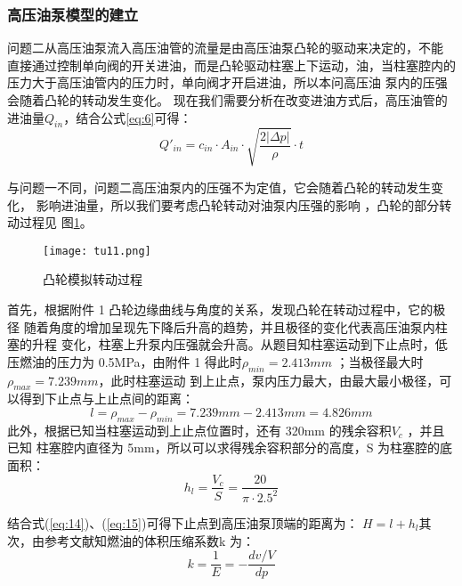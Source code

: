 \documentclass{cumcmthesis}
\begin{document}
\subsubsection{高压油泵模型的建立}
问题二从高压油泵流入高压油管的流量是由高压油泵凸轮的驱动来决定的\textsuperscript{\cite{bib:six}}，不能 直接通过控制单向阀的开关进油，而是凸轮驱动柱塞上下运动\textsuperscript{\cite{bib:seven}}，油，当柱塞腔内的压力大于高压油管内的压力时，单向阀才开启进油，所以本问高压油 泵内的压强会随着凸轮的转动发生变化。 现在我们需要分析在改变进油方式后，高压油管的进油量$Q_{in}$，结合公式\ref{eq:6}可得： 
\begin{equation*}
Q'_{in}=c_{in}\cdot A_{in}\cdot \sqrt{\frac {2 \lvert \Delta p \rvert}{\rho}}\cdot t
\end{equation*}

 与问题一不同，问题二高压油泵内的压强不为定值，它会随着凸轮的转动发生变化， 影响进油量，所以我们要考虑凸轮转动对油泵内压强的影响\textsuperscript{\cite{bib:eight}} ，凸轮的部分转动过程见 图\ref{fig:11}。
 
 \begin{figure}[htb] \centering 
 	
 	\texttt{[image: tu11.png]} 
 	
 	\caption{凸轮模拟转动过程} \label{fig:11}
  \end{figure}  
  
 
 首先，根据附件 1 凸轮边缘曲线与角度的关系，发现凸轮在转动过程中，它的极径 随着角度的增加呈现先下降后升高的趋势，并且极径的变化代表高压油泵内柱塞的升程 变化，柱塞上升泵内压强就会升高。从题目知柱塞运动到下止点时，低压燃油的压力为 0.5MPa，由附件 1 得此时$\rho_{min}=2.413mm$ ；当极径最大时$\rho_{max}=7.239mm$，此时柱塞运动 到上止点，泵内压力最大，由最大最小极径，可以得到下止点与上止点间的距离：
 \begin{equation}
 l=\rho_{max}-\rho_{min}=7.239mm-2.413mm=4.826mm\label{eq:14}
 \end{equation}
此外，根据已知当柱塞运动到上止点位置时，还有 320mm 的残余容积$V_{c}$ ，并且已知 柱塞腔内直径为 5mm，所以可以求得残余容积部分的高度，S 为柱塞腔的底面积： 
\begin{equation}
h_{l}=\frac{V_{c}}{S}=\frac{20}{\pi \cdot 2.5^{2}}\label{eq:15}
\end{equation}


结合式(\ref{eq:14})、(\ref{eq:15})可得下止点到高压油泵顶端的距离为： $H=l+h_{l}$其次，由参考文献\textsuperscript{\cite{bib:one}}知燃油的体积压缩系数k 为： 
\begin{equation}
k=\frac{1}{E}=-\frac{dv/V}{dp}\label{eq:16}
\end{equation}
\end{document}
